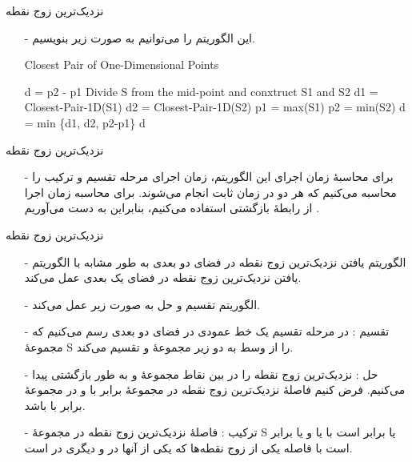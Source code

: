 \begin{frame}{‌نزدیک‌ترین زوج نقطه}
\begin{itemize}\itemr
\item[-]
این الگوریتم را می‌توانیم به صورت زیر بنویسیم.
\begin{algorithm}[H]\alglr
  \caption{Closest Pair of One-Dimensional Points} 
  \begin{algorithmic}[1]
    
       \State \Return d = p2 - p1
     \EndIf
     \State Divide S from the mid-point and conxtruct S1 and S2
     \State d1 = Closest-Pair-1D(S1)
     \State d2 = Closest-Pair-1D(S2)
     \State p1 = max(S1)
     \State p2 = min(S2)
     \State d = min \{d1, d2, p2-p1\}   
     \State \Return d                 
  \end{algorithmic}
  \label{alg:merge}
\end{algorithm}
\end{itemize}
\end{frame}


\begin{frame}{‌نزدیک‌ترین زوج نقطه}
\begin{itemize}\itemr
\item[-]
برای محاسبهٔ زمان اجرای این الگوریتم، زمان اجرای مرحله تقسیم و ترکیب را محاسبه می‌کنیم که هر دو در زمان ثابت انجام می‌شوند.
برای محاسبه زمان اجرا از رابطهٔ بازگشتی
استفاده می‌کنیم، بنابراین به دست می‌آوریم
 .
\end{itemize}
\end{frame}


\begin{frame}{‌نزدیک‌ترین زوج نقطه}
\begin{itemize}\itemr
\item[-]
الگوریتم یافتن نزدیک‌ترین زوج نقطه در فضای دو بعدی به طور مشابه با الگوریتم یافتن نزدیک‌ترین زوج نقطه در فضای یک بعدی عمل می‌کند.
\item[-]
الگوریتم تقسیم و حل به صورت زیر عمل می‌کند.
\item[-]
تقسیم : در مرحله تقسیم یک خط عمودی در فضای دو بعدی رسم می‌کنیم که مجموعهٔ S را از وسط به دو زیر مجموعهٔ
و
تقسیم می‌کند.
\item[-]
حل : نزدیک‌ترین زوج نقطه را در بین نقاط مجموعهٔ
و
به طور بازگشتی پیدا می‌کنیم. فرض کنیم فاصلهٔ نزدیک‌ترین زوج نقطه در مجموعهٔ
برابر با
و در مجموعهٔ
برابر با
باشد.
\item[-]
ترکیب : فاصلهٔ نزدیک‌ترین زوج نقطه در مجموعهٔ S یا برابر است با
یا
و یا برابر است با فاصله یکی از زوج نقطه‌ها که یکی از آنها در
و دیگری در
است.
\end{itemize}
\end{frame}


